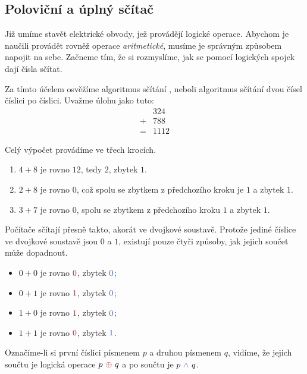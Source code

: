 \subsection{Poloviční a úplný sčítač}
\label{ssec:polovicni-a-uplny-scitac}

Již umíme stavět elektrické obvody, jež provádějí logické operace. Abychom je
naučili provádět rovněž operace \emph{aritmetické}, musíme je správným způsobem
napojit na sebe. Začneme tím, že si rozmyslíme, jak se pomocí logických spojek
dají čísla sčítat.

Za tímto účelem osvěžíme algoritmus sčítání , neboli algoritmus
sčítání dvou čísel číslici po číslici.
Uvažme úlohu jako tuto:
\begin{equation*}
  \begin{array}{rr}
    & 324 \\
    + & 788\\
    \hline
    = & 1112
  \end{array}
\end{equation*}

Celý výpočet provádíme ve třech krocích.
\begin{enumerate}
  \item $4 + 8$ je rovno $12$, tedy $2$, zbytek $1$.
  \item $2 + 8$ je rovno $0$, což spolu se zbytkem z předchozího kroku je $1$ a
    zbytek $1$.
  \item $3 + 7$ je rovno $0$, spolu se zbytkem z předchozího kroku $1$ a zbytek
    $1$.
\end{enumerate}

Počítače sčítají přesně takto, akorát ve dvojkové soustavě. Protože jediné
číslice ve dvojkové soustavě jsou $0$ a $1$, existují pouze čtyři způsoby, jak
jejich součet může dopadnout.
\begin{itemize}
  \item $0 + 0$ je rovno $\clr{0}$, zbytek $\clb{0}$;
  \item $0 + 1$ je rovno $\clr{1}$, zbytek $\clb{0}$;
  \item $1 + 0$ je rovno $\clr{1}$, zbytek $\clb{0}$;
  \item $1 + 1$ je rovno $\clr{0}$, zbytek $\clb{1}$.
\end{itemize}

Označíme-li si první číslici písmenem $p$ a druhou písmenem $q$, vidíme, že
 jejich součtu je logická operace $p~\clr{\oplus}~q$ a
 po součtu je $p~\clb{\wedge}~q$.

